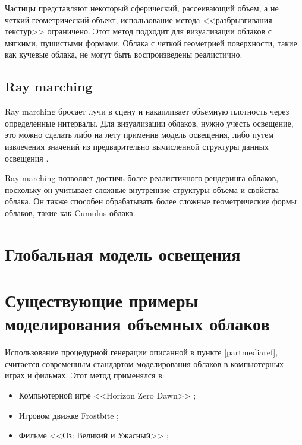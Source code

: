 Частицы представляют некоторый сферический, рассеивающий объем, а не четкий геометрический объект, использование метода <<разбрызгивания текстур>> ограничено.  Этот метод подходит для визуализации облаков с мягкими, пушистыми формами. Облака с четкой геометрией поверхности, такие как кучевые облака, не могут быть воспроизведены реалистично.


\subsection{Ray marching}
\label{ray}
Ray marching бросает лучи в сцену и накапливает объемную плотность через определенные интервалы. Для визуализации облаков, нужно учесть освещение, это можно сделать либо на лету применив модель освещения, либо путем извлечения значений из предварительно вычисленной структуры данных освещения \cite{hzd, frostbite, clouds}.

Ray marching позволяет достичь более реалистичного рендеринга облаков, поскольку он учитывает сложные внутренние структуры объема и свойства облака. Он также способен обрабатывать более сложные геометрические формы облаков, такие как Cumulus облака.


\section{Глобальная модель освещения}




\section{Существующие примеры моделирования объемных облаков}

Использование процедурной генерации описанной в пункте \ref{partmediaref}, считается современным стандартом моделирования облаков в компьютерных играх и фильмах. Этот метод применялся в:
\begin{itemize}
	\item Компьютерной игре <<Horizon Zero Dawn>> \cite{hzd};
	\item Игровом движке Frostbite \cite{frostbite};
	\item Фильме <<Оз: Великий и Ужасный>> \cite{oz};
\end{itemize}











